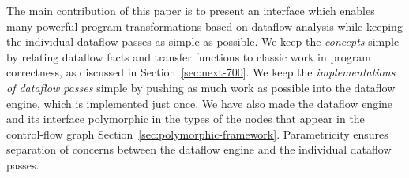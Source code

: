 \documentclass[blockstyle,preprint,nocopyrightspace]{sigplanconf}
\newcommand\secref[1]{Section~\ref{sec:#1}}
\begin{document}
The main contribution of this paper is to present an interface which
enables many powerful program transformations based on dataflow
analysis while keeping the individual dataflow passes as simple as
possible.
We keep the \emph{concepts} simple by relating dataflow facts and
transfer functions to classic work in program correctness, as
discussed in \secref{next-700}.
We keep the \emph{implementations of dataflow passes} simple by pushing
as much work as
possible into the dataflow engine, which is implemented just once.
We have also made the dataflow engine and its interface polymorphic in
the types of 
the nodes that appear in the control-flow graph \secref{polymorphic-framework}.
Parametricity ensures separation of concerns between the dataflow
engine and the individual dataflow passes.




\end{document}
